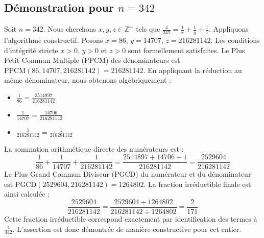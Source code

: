 \documentclass[11pt,a4paper]{article}
\begin{document}
\subsection{Démonstration pour $n = 342$}
Soit $n = 342$. Nous cherchons $x, y, z \in \mathbb{Z}^{+}$ tels que $\frac{4}{342} = \frac{1}{x} + \frac{1}{y} + \frac{1}{z}$.
Appliquons l'algorithme constructif. Posons $x = 86$, $y = 14707$, $z = 216281142$.
Les conditions d'intégrité stricte $x > 0$, $y > 0$ et $z > 0$ sont formellement satisfaites.
Le Plus Petit Commun Multiple (PPCM) des dénominateurs est $\text{PPCM}(86, 14707, 216281142) = 216281142$.
En appliquant la réduction au même dénominateur, nous obtenons algébriquement :
\begin{itemize}
    \item $\frac{1}{86} = \frac{2514897}{216281142}$
    \item $\frac{1}{14707} = \frac{14706}{216281142}$
    \item $\frac{1}{216281142} = \frac{1}{216281142}$
\end{itemize}
La sommation arithmétique directe des numérateurs est :
$$ \frac{1}{86} + \frac{1}{14707} + \frac{1}{216281142} = \frac{2514897 + 14706 + 1}{216281142} = \frac{2529604}{216281142} $$
Le Plus Grand Commun Diviseur (PGCD) du numérateur et du dénominateur est $\text{PGCD}(2529604, 216281142) = 1264802$.
La fraction irréductible finale est ainsi calculée :
$$ \frac{2529604}{216281142} = \frac{2529604 \div 1264802}{216281142 \div 1264802} = \frac{2}{171} $$
Cette fraction irréductible correspond exactement par identification des termes à $\frac{4}{342}$. L'assertion est donc démontrée de manière constructive pour cet entier.
\end{document}
